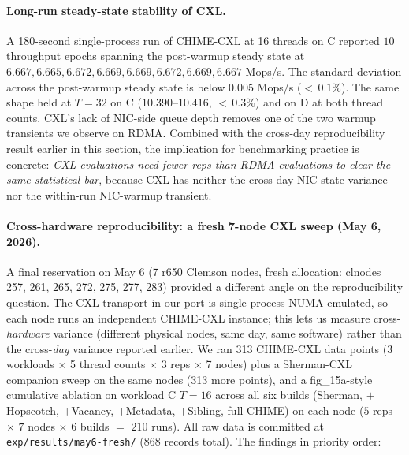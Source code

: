 \documentclass[11pt,a4paper]{article}
\begin{document}
\paragraph{Long-run steady-state stability of CXL.} A 180-second single-process run of CHIME-CXL at 16 threads on C reported $10$ throughput epochs spanning the post-warmup steady state at $6.667, 6.665, 6.672, 6.669, 6.669, 6.672, 6.669, 6.667$ Mops/s. The standard deviation across the post-warmup steady state is below $0.005$ Mops/s ($<$\,$0.1\%$). The same shape held at $T=32$ on C ($10.390$--$10.416$, $<$\,$0.3\%$) and on D at both thread counts. CXL's lack of NIC-side queue depth removes one of the two warmup transients we observe on RDMA. Combined with the cross-day reproducibility result earlier in this section, the implication for benchmarking practice is concrete: \emph{CXL evaluations need fewer reps than RDMA evaluations to clear the same statistical bar}, because CXL has neither the cross-day NIC-state variance nor the within-run NIC-warmup transient.

\paragraph{Cross-hardware reproducibility: a fresh 7-node CXL sweep (May 6, 2026).} A final reservation on May 6 (7 r650 Clemson nodes, fresh allocation: clnodes 257, 261, 265, 272, 275, 277, 283) provided a different angle on the reproducibility question. The CXL transport in our port is single-process NUMA-emulated, so each node runs an independent CHIME-CXL instance; this lets us measure cross-\emph{hardware} variance (different physical nodes, same day, same software) rather than the cross-\emph{day} variance reported earlier. We ran 313 CHIME-CXL data points (3 workloads $\times$ 5 thread counts $\times$ 3 reps $\times$ 7 nodes) plus a Sherman-CXL companion sweep on the same nodes (313 more points), and a fig\_15a-style cumulative ablation on workload C $T=16$ across all six builds (Sherman, $+$Hopscotch, $+$Vacancy, $+$Metadata, $+$Sibling, full CHIME) on each node ($5$ reps $\times$ $7$ nodes $\times$ $6$ builds $=$ $210$ runs). All raw data is committed at \texttt{exp/results/may6-fresh/} (868 records total). The findings in priority order:
\end{document}
